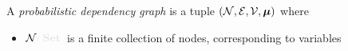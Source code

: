 \documentclass{article}
\newcommand{\notation}[2][]{#1}
\renewcommand{\notation}[2][]{{\color{notationcolor} #2}}
\newcommand\Set{\textbf{Set}}
\newcommand{\N}{\mathcal N}
\newcommand{\modelname}{probabilistic dependency graph}
\newcommand{\MN}{PDG}
\numberwithin{equation}{section}
\begin{document}
	\begin{defn}[\MN]\label{def:model}
		A \emph{\modelname} is a tuple $\mnvars[]$ where
		\begin{itemize}[nosep]
			\item $\N\notation{:\Set}$~is a finite collection of nodes, corresponding to variables
			

\end{itemize}
\end{defn}
\end{document}
